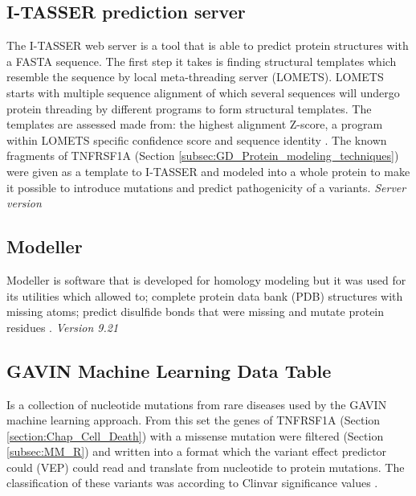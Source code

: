 \subsection{I-TASSER prediction server}
The I-TASSER web server is a tool that is able to predict protein structures with a FASTA sequence. The first step it takes is finding structural templates which resemble the sequence by local meta-threading server (LOMETS).
LOMETS starts with multiple sequence alignment of which several sequences will undergo protein threading by different programs to form structural templates. 
The templates are assessed made from: the highest alignment Z-score, a program within LOMETS specific confidence score and sequence identity \cite{zhang_lab_lomets_nodate, wu_lomets:_2007}.
The known fragments of TNFRSF1A (Section \ref{subsec:GD_Protein_modeling_techniques}) were given as a template to I-TASSER and modeled into a whole protein to make it possible to introduce mutations and predict pathogenicity of a variants.
\label{subsec:MM_I_TASSER}
\newline
\textit{Server version}

\subsection{Modeller}
Modeller is software that is developed for homology modeling but it was used for its utilities which allowed to; complete protein data bank (PDB) structures with missing atoms; predict disulfide bonds that were missing and mutate protein residues \cite{modeller_about_nodate,eswar_comparative_2006}. 
\label{subsec:MM_Modeller}
\newline
\textit{Version 9.21}

\subsection{GAVIN Machine Learning Data Table}
Is a collection of nucleotide mutations from rare diseases used by the GAVIN \cite{van_der_velde_gavin:_2017} machine learning approach. From this set the genes of TNFRSF1A (Section \ref{section:Chap_Cell_Death}) with a missense mutation were filtered (Section \ref{subsec:MM_R}) and written into a format which the variant effect predictor could (VEP) \cite{ensembl_variant_nodate} could read and translate from nucleotide to protein mutations. The classification of these variants was according to Clinvar significance values \cite{ncbi_representation_nodate}. 
\label{subsec:MM_GAVIN_data_table}


